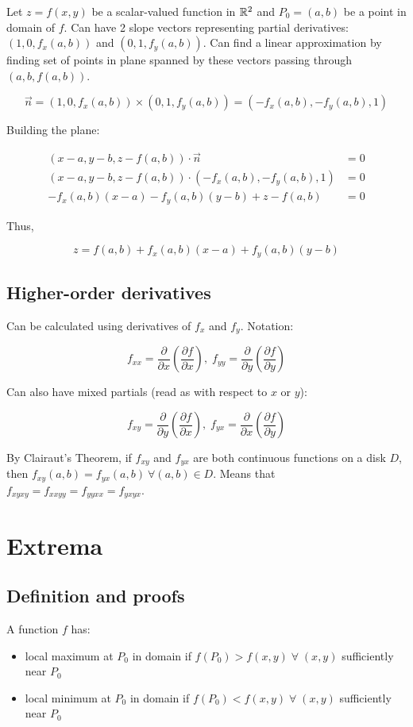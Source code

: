 Let $z=f(x,y)$ be a scalar-valued function in $\mathbb{R}^2$ and $P_0=(a,b)$ be a point in domain of $f$. Can have 2 slope vectors representing partial derivatives:
$(1,0,f_x(a,b))$ and $(0,1,f_y(a,b))$. Can find a linear approximation by finding set of points in plane spanned by these vectors passing through
$(a,b,f(a,b))$.

\[\vec{n}=(1,0,f_x(a,b))\times(0,1,f_y(a,b))=(-f_x(a,b),-f_y(a,b),1)\]

Building the plane:

\begin{align*}
    (x-a, y-b, z-f(a, b)) \cdot \vec{n} &=0 \\
    (x-a, y-b, z-f(a, b)) \cdot\left(-f_{x}(a, b),-f_{y}(a, b), 1\right) &=0 \\
    -f_{x}(a, b)(x-a)-f_{y}(a, b)(y-b)+z-f(a, b) &=0
\end{align*}

Thus,

\[z=f(a, b)+f_{x}(a, b)(x-a)+f_{y}(a, b)(y-b)\]

\subsection{Higher-order derivatives}

Can be calculated using derivatives of $f_x$ and $f_y$. Notation:

\[f_{xx}=\frac{\partial}{\partial x}(\frac{\partial f}{\partial x}),\; f_{yy}=\frac{\partial}{\partial y}(\frac{\partial f}{\partial y})\]

Can also have mixed partials (read as with respect to $x$ or $y$):

\[f_{xy}=\frac{\partial}{\partial y}(\frac{\partial f}{\partial x}),\; f_{yx}=\frac{\partial}{\partial x}(\frac{\partial f}{\partial y})\]

By Clairaut's Theorem, if $f_{xy}$ and $f_{yx}$ are both continuous functions on a disk $D$, then $f_{xy}(a,b)=f_{yx}(a,b)\: \forall (a,b)\in D$. Means that $f_{xyxy}=f_{xxyy}=f_{yyxx}=f_{yxyx}$.

\section{Extrema}

\subsection{Definition and proofs}

A function $f$ has:
\begin{itemize}
    \item local maximum at $P_0$ in domain if $f(P_0)>f(x,y)\;\forall\;(x,y)$ sufficiently near $P_0$
    \item local minimum at $P_0$ in domain if $f(P_0)<f(x,y)\;\forall\;(x,y)$ sufficiently near $P_0$
\end{itemize}

